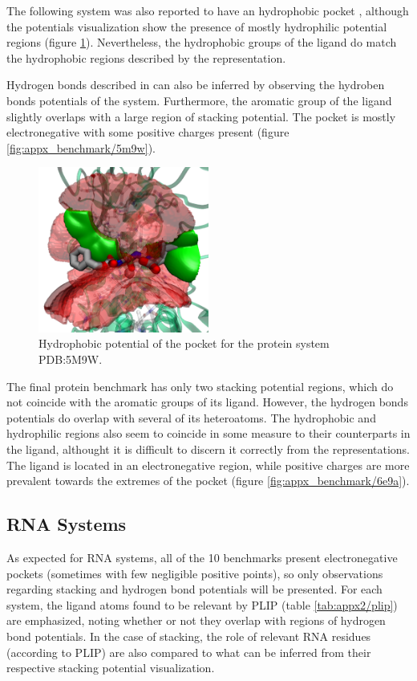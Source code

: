     The following system was also reported to have an hydrophobic pocket \cite{hydrophobic_2017}, although the potentials visualization show the presence of mostly hydrophilic potential regions (figure \ref{fig:benchmark/5m9w}). Nevertheless, the hydrophobic groups of the ligand do match the hydrophobic regions described by the representation.

    Hydrogen bonds described in \cite{hydrophobic_2017} can also be inferred by observing the hydroben bonds potentials of the system. Furthermore, the aromatic group of the ligand slightly overlaps with a large region of stacking potential. The pocket is mostly electronegative with some positive charges present (figure \ref{fig:appx_benchmark/5m9w}).

    \begin{figure}[H]
      \centering
      \includegraphics[width=0.5\textwidth]{figures/results/benchmark_prot/5m9w.png}
      \caption{\label{fig:benchmark/5m9w} Hydrophobic potential of the pocket for the protein system PDB:5M9W.}
    \end{figure}

    The final protein benchmark has only two stacking potential regions, which do not coincide with the aromatic groups of its ligand. However, the hydrogen bonds potentials do overlap with several of its heteroatoms. The hydrophobic and hydrophilic regions also seem to coincide in some measure to their counterparts in the ligand, althought it is difficult to discern it correctly from the representations. The ligand is located in an electronegative region, while positive charges are more prevalent towards the extremes of the pocket (figure \ref{fig:appx_benchmark/6e9a}).

  \subsection{RNA Systems}
    As expected for RNA systems, all of the 10 benchmarks present electronegative pockets (sometimes with few negligible positive points), so only observations regarding stacking and hydrogen bond potentials will be presented. For each system, the ligand atoms found to be relevant by PLIP (table \ref{tab:appx2/plip}) are emphasized, noting whether or not they overlap with regions of hydrogen bond potentials. In the case of stacking, the role of relevant RNA residues (according to PLIP) are also compared to what can be inferred from their respective stacking potential visualization.

